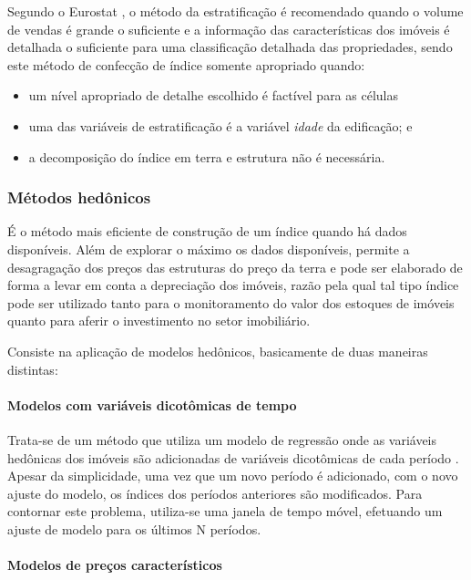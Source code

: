 \documentclass[
	12pt,				%
	oneside,			%
	a4paper,			%
	chapter=TITLE,		%
	section=TITLE,		%
	english,			%
	brazil				%
	]{abntex2}
\begin{document}
Segundo o Eurostat \autocite*[158]{rppi}, o método da estratificação é recomendado quando o
volume de vendas é grande o suficiente e a informação das características dos
imóveis é detalhada o suficiente para uma classificação detalhada das
propriedades, sendo este método de confecção de índice somente apropriado quando:
\begin{itemize}
\tightlist
\item
  um nível apropriado de detalhe escolhido é factível para as células
\item
  uma das variáveis de estratificação é a variável \emph{idade} da edificação; e
\item
  a decomposição do índice em terra e estrutura não é necessária.
\end{itemize}
\hypertarget{muxe9todos-heduxf4nicos}{%
\subsubsection{Métodos hedônicos}\label{muxe9todos-heduxf4nicos}}

É o método mais eficiente de construção de um índice quando há dados
disponíveis. Além de explorar o máximo os dados disponíveis, permite a
desagragação dos preços das estruturas do preço da terra e pode ser elaborado de
forma a levar em conta a depreciação dos imóveis, razão pela qual tal tipo
índice pode ser utilizado tanto para o monitoramento do valor dos estoques de
imóveis quanto para aferir o investimento no setor imobiliário.

Consiste na aplicação de modelos hedônicos, basicamente de duas maneiras distintas:

\hypertarget{modelos-com-variuxe1veis-dicotuxf4micas-de-tempo}{%
\paragraph{Modelos com variáveis dicotômicas de tempo}\label{modelos-com-variuxe1veis-dicotuxf4micas-de-tempo}}

Trata-se de um método que utiliza um modelo de regressão onde as variáveis
hedônicas dos imóveis são adicionadas de variáveis dicotômicas de cada período
\autocite[158]{rppi}. Apesar da simplicidade, uma vez que um novo período é adicionado,
com o novo ajuste do modelo, os índices dos períodos anteriores são modificados.
Para contornar este problema, utiliza-se uma janela de tempo móvel, efetuando um
ajuste de modelo para os últimos N períodos.

\hypertarget{modelos-de-preuxe7os-caracteruxedsticos}{%
\paragraph{Modelos de preços característicos}\label{modelos-de-preuxe7os-caracteruxedsticos}}
\end{document}
